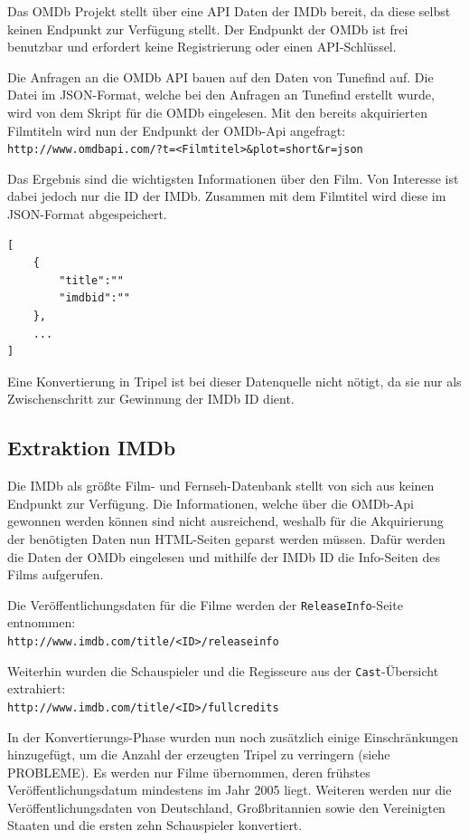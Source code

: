 \documentclass[parskip]{scrartcl}
\begin{document}
Das OMDb Projekt stellt über eine API Daten der IMDb bereit, da diese selbst keinen Endpunkt zur Verfügung stellt. Der Endpunkt der OMDb ist frei benutzbar und erfordert keine Registrierung oder einen API-Schlüssel.

Die Anfragen an die OMDb API bauen auf den Daten von Tunefind auf. Die Datei im JSON-Format, welche bei den Anfragen an Tunefind erstellt wurde, wird von dem Skript für die OMDb eingelesen. Mit den bereits akquirierten Filmtiteln wird nun der Endpunkt der OMDb-Api angefragt:\\
\texttt{http://www.omdbapi.com/?t=<Filmtitel>\&plot=short\&r=json}

Das Ergebnis sind die wichtigsten Informationen über den Film. Von Interesse ist dabei jedoch nur die ID der IMDb. Zusammen mit dem Filmtitel wird diese im JSON-Format abgespeichert.

\begin{lstlisting}[caption={OMDb JSON-Format}, label={list:omdbJson}]
[  
    {  
        "title":""
        "imdbid":""
    },
    ...
]
\end{lstlisting}

Eine Konvertierung in Tripel ist bei dieser Datenquelle nicht nötigt, da sie nur als Zwischenschritt zur Gewinnung der IMDb ID dient.

\subsection{Extraktion IMDb}

Die IMDb als größte Film- und Fernseh-Datenbank stellt von sich aus keinen Endpunkt zur Verfügung. Die Informationen, welche über die OMDb-Api gewonnen werden können sind nicht ausreichend, weshalb für die Akquirierung der benötigten Daten nun HTML-Seiten geparst werden müssen. Dafür werden die Daten der OMDb eingelesen und mithilfe der IMDb ID die Info-Seiten des Films aufgerufen.

Die Veröffentlichungsdaten für die Filme werden der \texttt{ReleaseInfo}-Seite entnommen:\\
\texttt{http://www.imdb.com/title/<ID>/releaseinfo}

Weiterhin wurden die Schauspieler und die Regisseure aus der \texttt{Cast}-Übersicht extrahiert:\\
\texttt{http://www.imdb.com/title/<ID>/fullcredits}

In der Konvertierungs-Phase wurden nun noch zusätzlich einige Einschränkungen hinzugefügt, um die Anzahl der erzeugten Tripel zu verringern (siehe PROBLEME). Es werden nur Filme übernommen, deren frühstes Veröffentlichungsdatum mindestens im Jahr 2005 liegt. Weiteren werden nur die Veröffentlichungsdaten von Deutschland, Großbritannien sowie den Vereinigten Staaten und die ersten zehn Schauspieler konvertiert.
\end{document}
